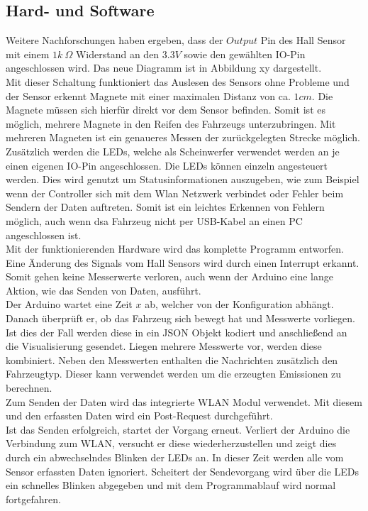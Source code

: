 \documentclass[.../Dokumentation.tex]{subfiles}
\begin{document}
    \subsection{Hard- und Software}\label{sec-ita2-hardware}
    Weitere Nachforschungen haben ergeben, dass der $Output$ Pin des Hall Sensor mit einem $1k\ \Omega$  Widerstand an den $3.3V$ sowie den gewählten IO-Pin angeschlossen wird. Das neue Diagramm ist in Abbildung xy dargestellt. \\
    Mit dieser Schaltung funktioniert das Auslesen des Sensors ohne Probleme und der Sensor erkennt Magnete mit einer maximalen Distanz von ca. $1 cm$. Die Magnete müssen sich hierfür direkt vor dem Sensor befinden. Somit ist es möglich, mehrere Magnete in den Reifen des Fahrzeugs unterzubringen. Mit mehreren Magneten ist ein genaueres Messen der zurückgelegten Strecke möglich. Zusätzlich werden die LEDs, welche als Scheinwerfer verwendet werden an je einen eigenen IO-Pin angeschlossen. Die LEDs können einzeln angesteuert werden. Dies wird genutzt um Statusinformationen auszugeben, wie zum Beispiel wenn der Controller sich mit dem Wlan Netzwerk verbindet oder Fehler beim Sendern der Daten auftreten. Somit ist ein leichtes Erkennen von Fehlern möglich, auch wenn dsa Fahrzeug nicht per USB-Kabel an einen PC angeschlossen ist.\\
    Mit der funktionierenden Hardware wird das komplette Programm entworfen. Eine Änderung des Signals vom Hall Sensors wird durch einen Interrupt erkannt. Somit gehen keine Messerwerte verloren, auch wenn der Arduino eine lange Aktion, wie das Senden von Daten, ausführt.\\
    Der Arduino wartet eine Zeit $x$ ab, welcher von der Konfiguration abhängt. Danach überprüft er, ob das Fahrzeug sich bewegt hat und Messwerte vorliegen. Ist dies der Fall werden diese in ein JSON Objekt kodiert und anschließend an die Visualisierung gesendet. Liegen mehrere Messwerte vor, werden diese kombiniert. Neben den Messwerten enthalten die Nachrichten zusätzlich den Fahrzeugtyp. Dieser kann verwendet werden um die erzeugten Emissionen zu berechnen.\\
    Zum Senden der Daten wird das integrierte WLAN Modul verwendet. Mit diesem und den erfassten Daten wird ein Post-Request durchgeführt.\\
   	Ist das Senden erfolgreich, startet der Vorgang erneut. Verliert der Arduino die Verbindung zum WLAN, versucht er diese wiederherzustellen und zeigt dies durch ein abwechselndes Blinken der LEDs an. In dieser Zeit werden alle vom Sensor erfassten Daten ignoriert. Scheitert der Sendevorgang wird über die LEDs ein schnelles  Blinken abgegeben und mit dem Programmablauf wird normal fortgefahren. 
\end{document}
